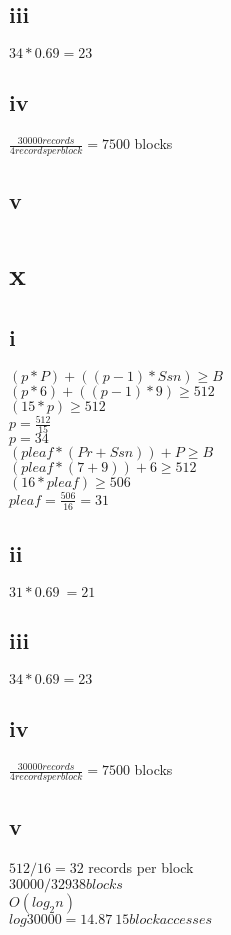 \documentclass[11pt]{article}
\theoremstyle{plain}
\theoremstyle{definition}
\begin{document}
\subsection*{iii}
$34*0.69 = 23$

\subsection*{iv}
 $\frac{30000 records}{4 records per block} = 7500$ blocks

\subsection*{v}

\section*{x}
\subsection*{i}
$(p * P) + ((p − 1) * Ssn) \geq B$\\
$(p * 6) + ((p − 1) * 9) \geq 512$\\
$(15 * p) \geq 512$\\
$p = \frac{512}{15}$\\
$p=34$\\

$(pleaf * (Pr + Ssn)) + P \geq B$\\
$(pleaf * (7 + 9)) + 6 \geq 512$\\
$(16 * pleaf) \geq 506$\\
$pleaf = \frac{506}{16} = 31$\\

\subsection*{ii}
$31*0.69 ~= 21$

\subsection*{iii}
$34*0.69 = 23$

\subsection*{iv}
 $\frac{30000 records}{4 records per block} = 7500$ blocks

\subsection*{v}
$512/16 = 32$ records per block\\
$30000 / 32 938 blocks$\\
$O(log_2 n)$\\
$log 30000 = 14.87 ~ 15 block accesses$\\
\end{document}
